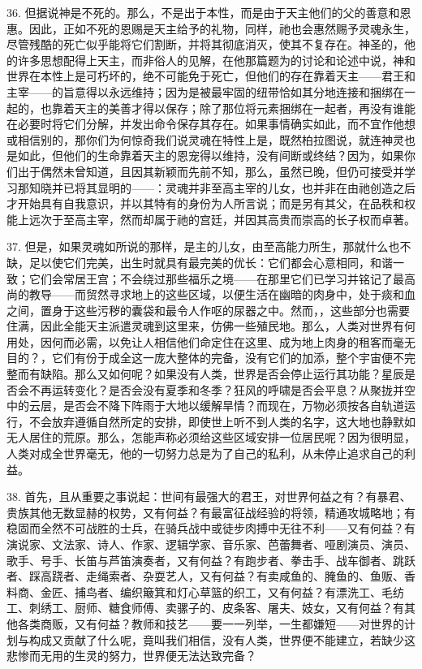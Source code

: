 36. 但据说神是不死的。那么，不是出于本性，而是由于天主他们的父的善意和恩惠。因此，正如不死的恩赐是天主给予的礼物，同样，祂也会惠然赐予灵魂永生，尽管残酷的死亡似乎能将它们割断，并将其彻底消灭，使其不复存在。神圣的，他的许多思想配得上天主，而非俗人的见解，在他那篇题为的讨论和论述中说，神和世界在本性上是可朽坏的，绝不可能免于死亡，但他们的存在靠着天主——君王和主宰——的旨意得以永远维持；因为是被最牢固的纽带恰如其分地连接和捆绑在一起的，也靠着天主的美善才得以保存；除了那位将元素捆绑在一起者，再没有谁能在必要时将它们分解，并发出命令保存其存在。如果事情确实如此，而不宜作他想或相信别的，那你们为何惊奇我们说灵魂在特性上是，既然柏拉图说，就连神灵也是如此，但他们的生命靠着天主的恩宠得以维持，没有间断或终结？因为，如果你们出于偶然未曾知道，且因其新颖而先前不知，那么，虽然已晚，但仍可接受并学习那知晓并已将其显明的——：灵魂并非至高主宰的儿女，也并非在由祂创造之后才开始具有自我意识，并以其特有的身份为人所言说；而是另有其父，在品秩和权能上远次于至高主宰，然而却属于祂的宫廷，并因其高贵而崇高的长子权而卓著。\par

37. 但是，如果灵魂如所说的那样，是主的儿女，由至高能力所生，那就什么也不缺，足以使它们完美，出生时就具有最完美的优长：它们都会心意相同，和谐一致；它们会常居王宫；不会绕过那些福乐之境——在那里它们已学习并铭记了最高尚的教导——而贸然寻求地上的这些区域，以便生活在幽暗的肉身中，处于痰和血之间，置身于这些污秽的囊袋和最令人作呕的尿器之中。然而，，这些部分也需要住满，因此全能天主派遣灵魂到这里来，仿佛一些殖民地。那么，人类对世界有何用处，因何而必需，以免让人相信他们命定住在这里、成为地上肉身的租客而毫无目的？，它们有份于成全这一庞大整体的完备，没有它们的加添，整个宇宙便不完整而有缺陷。那么又如何呢？如果没有人类，世界是否会停止运行其功能？星辰是否会不再运转变化？是否会没有夏季和冬季？狂风的呼啸是否会平息？从聚拢并空中的云层，是否会不降下阵雨于大地以缓解旱情？而现在，万物必须按各自轨道运行，不会放弃遵循自然所定的安排，即使世上听不到人类的名字，这大地也静默如无人居住的荒原。那么，怎能声称必须给这些区域安排一位居民呢？因为很明显，人类对成全世界毫无，他的一切努力总是为了自己的私利，从未停止追求自己的利益。\par

38. 首先，且从重要之事说起：世间有最强大的君王，对世界何益之有？有暴君、贵族其他无数显赫的权势，又有何益？有最富征战经验的将领，精通攻城略地；有稳固而全然不可战胜的士兵，在骑兵战中或徒步肉搏中无往不利——又有何益？有演说家、文法家、诗人、作家、逻辑学家、音乐家、芭蕾舞者、哑剧演员、演员、歌手、号手、长笛与芦笛演奏者，又有何益？有跑步者、拳击手、战车御者、跳跃者、踩高跷者、走绳索者、杂耍艺人，又有何益？有卖咸鱼的、腌鱼的、鱼贩、香料商、金匠、捕鸟者、编织簸箕和灯心草篮的织工，又有何益？有漂洗工、毛纺工、刺绣工、厨师、糖食师傅、卖骡子的、皮条客、屠夫、妓女，又有何益？有其他各类商贩，又有何益？教师和技艺——要一一列举，一生都嫌短——对世界的计划与构成又贡献了什么呢，竟叫我们相信，没有人类，世界便不能建立，若缺少这悲惨而无用的生灵的努力，世界便无法达致完备？\par

